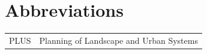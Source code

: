\section*{Abbreviations}
\begin{tabular}{p{}p{}}
	PLUS &  Planning of Landscape and Urban Systems \\
\end{tabular}